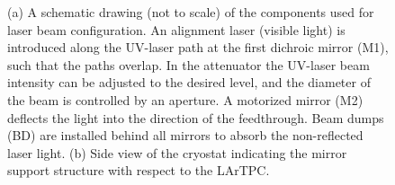 \begin{figure}%
    \centering
    \qquad
    \caption{(a) A schematic drawing (not to scale) of the components used for laser beam configuration.  An alignment laser (visible light) is introduced along the UV-laser path at the first dichroic mirror (M1), such that the paths overlap. In the attenuator the UV-laser beam intensity can be adjusted to the desired level, and the diameter of the beam is controlled by an aperture. A motorized mirror (M2) deflects the light into the direction of the feedthrough. Beam dumps (BD) are installed behind all mirrors to absorb the non-reflected laser light. (b) Side view of the cryostat indicating the mirror support structure with respect to the LArTPC.}%
    \label{fig:optics}%
\end{figure}


